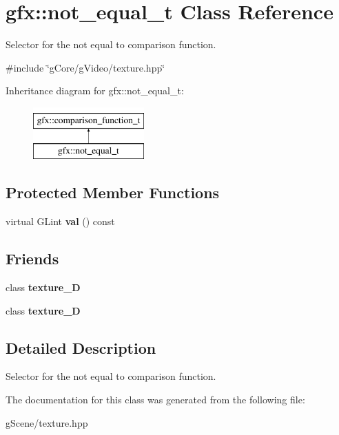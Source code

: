 \hypertarget{classgfx_1_1not__equal__t}{\section{gfx\-:\-:not\-\_\-equal\-\_\-t Class Reference}
\label{classgfx_1_1not__equal__t}
}


Selector for the not equal to comparison function.  




{\ttfamily \#include \char`\"{}g\-Core/g\-Video/texture.\-hpp\char`\"{}}

Inheritance diagram for gfx\-:\-:not\-\_\-equal\-\_\-t\-:\begin{figure}[H]
\begin{center}
\leavevmode
\includegraphics[height=2.000000cm]{classgfx_1_1not__equal__t}
\end{center}
\end{figure}
\subsection*{Protected Member Functions}
\begin{DoxyCompactItemize}
\item 
\hypertarget{classgfx_1_1not__equal__t_acb3d2a78c702618c29e26cbab8d94a31}{virtual G\-Lint {\bfseries val} () const }\label{classgfx_1_1not__equal__t_acb3d2a78c702618c29e26cbab8d94a31}

\end{DoxyCompactItemize}
\subsection*{Friends}
\begin{DoxyCompactItemize}
\item 
\hypertarget{classgfx_1_1not__equal__t_a2039d67f6166ccf823c78e3476aad9aa}{class {\bfseries texture\-\_\-D}}\label{classgfx_1_1not__equal__t_a2039d67f6166ccf823c78e3476aad9aa}

\item 
\hypertarget{classgfx_1_1not__equal__t_a22ad86ef46c3b17357a0cd59e50bc7dd}{class {\bfseries texture\-\_\-D}}\label{classgfx_1_1not__equal__t_a22ad86ef46c3b17357a0cd59e50bc7dd}

\end{DoxyCompactItemize}


\subsection{Detailed Description}
Selector for the not equal to comparison function. 

The documentation for this class was generated from the following file\-:\begin{DoxyCompactItemize}
\item 
g\-Scene/texture.\-hpp\end{DoxyCompactItemize}
